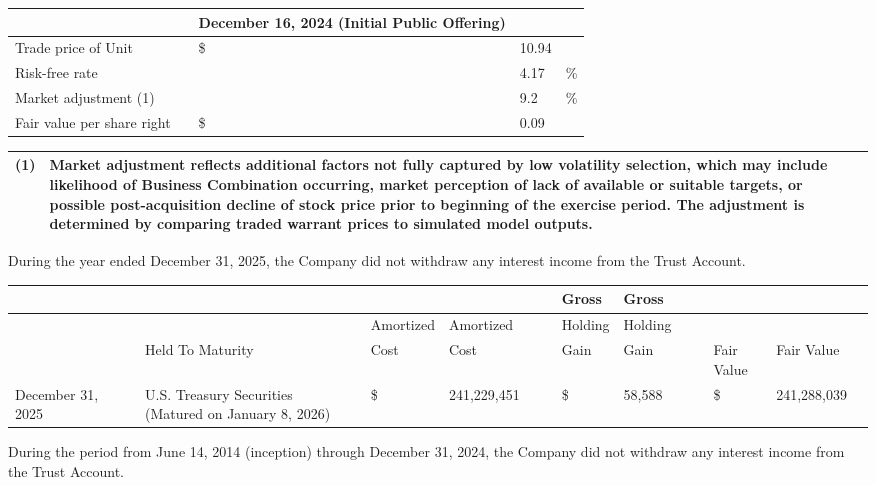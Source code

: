 \documentclass[11pt,a4paper]{article}
\begin{document}
\begin{table}[h]
\begin{tabular}{|l|l|l|l|l|}
\hline
 &  & \textbf{December 16, 2024}  \textbf{(Initial Public Offering)} &  &  \\ \hline
Trade price of Unit &  & \$ & 10.94 &  \\ \hline
Risk-free rate &  &  & 4.17 & \% \\ \hline
Market adjustment (1) &  &  & 9.2 & \% \\ \hline
Fair value per share right &  & \$ & 0.09 &  \\ \hline
\end{tabular}
\end{table}

\begin{table}[h]
\begin{tabular}{|l|l|}
\hline
(1) & Market adjustment reflects additional factors not fully captured by low volatility selection, which may include likelihood of Business Combination occurring, market perception of lack of available or suitable targets, or possible post-acquisition decline of stock price prior to beginning of the exercise period. The adjustment is determined by comparing traded warrant prices to simulated model outputs. \\ \hline
\end{tabular}
\end{table}

During the year ended December 31, 2025, the Company did not withdraw any interest income from the Trust Account.

\begin{table}[h]
\begin{tabular}{|l|l|l|l|l|l|l|l|l|l|l|l|l|l|l|l|}
\hline
 &  &  &  &  &  &  &  &  & Gross & Gross &  &  &  &  &  \\ \hline
 &  &  &  &  & Amortized & Amortized &  &  & Holding & Holding &  &  &  &  &  \\ \hline
 &  &  & Held To Maturity &  & Cost & Cost &  &  & Gain & Gain &  &  & Fair Value & Fair Value &  \\ \hline
December 31, 2025 &  &  & U.S. Treasury Securities (Matured on January 8, 2026) &  & \$ & 241,229,451 &  &  & \$ & 58,588 &  &  & \$ & 241,288,039 &  \\ \hline
\end{tabular}
\end{table}

During the period from June 14, 2014 (inception) through December 31, 2024, the Company did not withdraw any interest income from the Trust Account.
\end{document}
